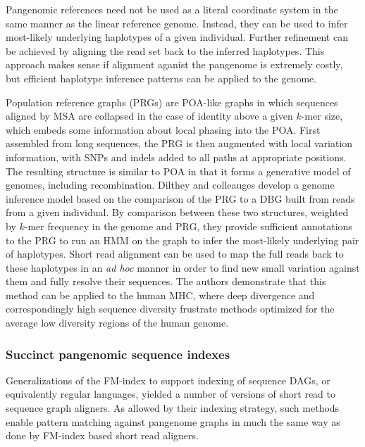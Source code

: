 Pangenomic references need not be used as a literal coordinate system in the same manner as the linear reference genome.
Instead, they can be used to infer most-likely underlying haplotypes of a given individual.
Further refinement can be achieved by aligning the read set back to the inferred haplotypes.
This approach makes sense if alignment aganist the pangenome is extremely costly, but efficient haplotype inference patterns can be applied to the genome.

Population reference graphs (PRGs) \cite{dilthey2015improved} are POA-like graphs in which sequences aligned by MSA are collapsed in the case of identity above a given $k$-mer size, which embeds some information about local phasing into the POA.
First assembled from long sequences, the PRG is then augmented with local variation information, with SNPs and indels added to all paths at appropriate positions.
The resulting structure is similar to POA in that it forms a generative model of genomes, including recombination.
Dilthey and colleauges develop a genome inference model based on the comparison of the PRG to a DBG built from reads from a given individual.
By comparison between these two structures, weighted by $k$-mer frequency in the genome and PRG, they provide sufficient annotations to the PRG to run an HMM on the graph to infer the most-likely underlying pair of haplotypes.
Short read alignment can be used to map the full reads back to these haplotypes in an \emph{ad hoc} manner in order to find new small variation against them and fully resolve their sequences.
The authors demonstrate that this method can be applied to the human MHC, where deep divergence and correspondingly high sequence diversity frustrate methods optimized for the average low diversity regions of the human genome.

\subsubsection{Succinct pangenomic sequence indexes}


Generalizations of the FM-index to support indexing of sequence DAGs, or equivalently regular languages, yielded a number of versions of short read to sequence graph aligners.
As allowed by their indexing strategy, such methods enable pattern matching against pangenome graphs in much the same way as done by FM-index based short read aligners.

